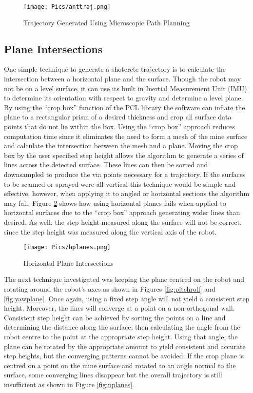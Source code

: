 \begin{figure}[h]
    \centering
    \texttt{[image: Pics/anttraj.png]}
    \caption{Trajectory Generated Using Microscopic Path Planning}
    \label{fig:anttraj}
\end{figure}

\subsection{Plane Intersections}

One simple technique to generate a shotcrete trajectory is to calculate the intersection between a horizontal plane and the surface. Though the robot may not be on a level surface, it can use its built in Inertial Measurement Unit (IMU) to determine its orientation with respect to gravity and determine a level plane. By using the ``crop box'' function of the PCL library the software can inflate the plane to a rectangular prism of a desired thickness and crop all surface data points that do not lie within the box. Using the ``crop box'' approach reduces computation time since it eliminates the need to form a mesh of the mine surface and calculate the intersection between the mesh and a plane. Moving the crop box by the user specified step height allows the algorithm to generate a series of lines across the detected surface. These lines can then be sorted and downsampled to produce the via points necessary for a trajectory. If the surfaces to be scanned or sprayed were all vertical this technique would be simple and effective, however, when applying it to angled or horizontal sections the algorithm may fail. Figure \ref{fig:hplanes} shows how using horizontal planes fails when applied to horizontal surfaces due to the ``crop box'' approach generating wider lines than desired. As well, the step height measured along the surface will not be correct, since the step height was measured along the vertical axis of the robot.\\

\begin{figure}[h]
    \centering
    \texttt{[image: Pics/hplanes.png]}
    \caption{Horizontal Plane Intersections}
    \label{fig:hplanes}
\end{figure}
The next technique investigated was keeping the plane centred on the robot and rotating around the robot's axes as shown in Figures \ref{fig:pitchroll} and \ref{fig:yawplane}. Once again, using a fixed step angle will not yield a consistent step height. Moreover, the lines will converge at a point on a non-orthogonal wall. Consistent step height can be achieved by sorting the points on a line and determining the distance along the surface, then calculating the angle from the robot centre to the point at the appropriate step height. Using that angle, the plane can be rotated by the appropriate amount to yield consistent and accurate step heights, but the converging patterns cannot be avoided. If the crop plane is centred on a point on the mine surface and rotated to an angle normal to the surface, some converging lines disappear but the overall trajectory is still insufficient as shown in Figure \ref{fig:nplanes}. \\

